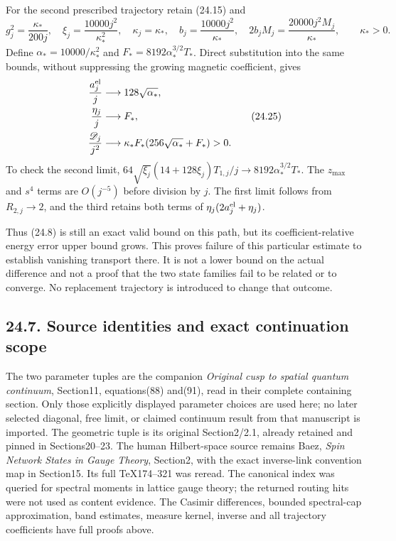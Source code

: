 \documentclass[
]{article}
\begin{document}
For the second prescribed trajectory retain (24.15) and \[
g_j^2=\frac{\kappa_*}{200j},\quad
\xi_j=\frac{10000j^2}{\kappa_*^2},\quad
\kappa_j=\kappa_*,\quad
b_j=\frac{10000j^2}{\kappa_*},\quad
2b_jM_j=\frac{20000j^2M_j}{\kappa_*},\qquad \kappa_*>0.
\tag{24.24}
\] Define \(\alpha_*=10000/\kappa_*^2\) and
\(F_*=8192\alpha_*^{3/2}T_*\). Direct substitution into the same bounds,
without suppressing the growing magnetic coefficient, gives \[
\begin{aligned}
\frac{a_j^{\rm el}}j&\longrightarrow128\sqrt{\alpha_*},\\
\frac{\eta_j}j&\longrightarrow F_*,\\
\frac{\mathscr D_j}{j^2}
 &\longrightarrow\kappa_*F_*
                (256\sqrt{\alpha_*}+F_*)>0 .
\end{aligned}\tag{24.25}
\] To check the second limit, \(64\sqrt{\xi_j}(14+128\xi_j)T_{1,j}/j
\to8192\alpha_*^{3/2}T_*\). The \(z_{\max}\) and \(s^4\) terms are
\(O(j^{-5})\) before division by \(j\). The first limit follows from
\(R_{2,j}\to2\), and the third retains both terms of
\(\eta_j(2a_j^{\rm el}+\eta_j)\).

Thus (24.8) is still an exact valid bound on this path, but its
coefficient-relative energy error upper bound grows. This proves failure
of this particular estimate to establish vanishing transport there. It
is not a lower bound on the actual difference and not a proof that the
two state families fail to be related or to converge. No replacement
trajectory is introduced to change that outcome.

\subsection{24.7. Source identities and exact continuation
scope}\label{source-identities-and-exact-continuation-scope}

The two parameter tuples are the companion \emph{Original cusp to
spatial quantum continuum}, Section11, equations(88) and(91), read in
their complete containing section. Only those explicitly displayed
parameter choices are used here; no later selected diagonal, free limit,
or claimed continuum result from that manuscript is imported. The
geometric tuple is its original Section2/2.1, already retained and
pinned in Sections20--23. The human Hilbert-space source remains Baez,
\emph{Spin Network States in Gauge Theory}, Section2, with the exact
inverse-link convention map in Section15. Its full TeX174--321 was
reread. The canonical index was queried for spectral moments in lattice
gauge theory; the returned routing hits were not used as content
evidence. The Casimir differences, bounded spectral-cap approximation,
band estimates, measure kernel, inverse and all trajectory coefficients
have full proofs above.
\end{document}
